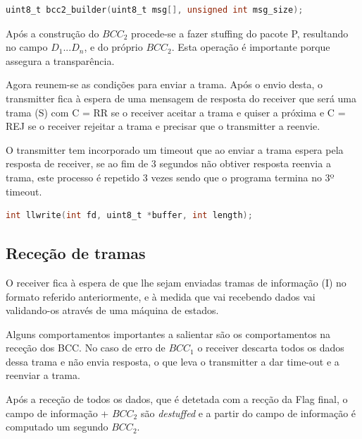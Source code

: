 \documentclass[a4paper,11pt,portuguese]{article}
\begin{document}
\begin{lstlisting}[language=C]
uint8_t bcc2_builder(uint8_t msg[], unsigned int msg_size);    
\end{lstlisting}

    Após a construção do $BCC_2$ procede-se a fazer stuffing do pacote P, resultando no
    campo $D_1...D_n$, e do próprio $BCC_2$. Esta operação é importante porque assegura a transparência.

    Agora reunem-se as condições para enviar a trama. Após o envio desta, o transmitter fica à espera
    de uma mensagem de resposta do receiver que será uma trama (S) com C = RR se o receiver aceitar a
    trama e quiser a próxima e C = REJ se o receiver rejeitar a trama e precisar que o transmitter a
    reenvie.

    O transmitter tem incorporado um timeout que ao enviar a trama espera pela resposta de receiver, se
    ao fim de 3 segundos não obtiver resposta reenvia a trama, este processo é repetido 3 vezes sendo que
    o programa termina no 3º timeout.

\begin{lstlisting}[language=C]
int llwrite(int fd, uint8_t *buffer, int length);   
\end{lstlisting}

    \subsection{Receção de tramas}

    O receiver fica à espera de que lhe sejam enviadas tramas de informação (I) no formato referido
    anteriormente, e à medida que vai recebendo dados vai validando-os através de uma máquina de estados.

    Alguns comportamentos importantes a salientar são os comportamentos na receção dos BCC.
    No caso de erro de $BCC_1$ o receiver descarta todos os dados dessa trama e não envia resposta, o que
    leva o transmitter a dar time-out e a reenviar a trama.

    Após a receção de todos os dados, que é detetada com a recção da Flag final, o campo de informação 
    + $BCC_2$ são \textit{destuffed} e a partir do campo de informação é computado um segundo $BCC_2$.
\end{document}
